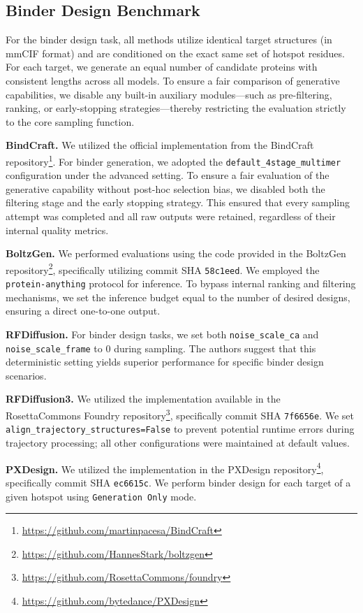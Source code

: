 \subsection{Binder Design Benchmark}
For the binder design task, all methods utilize identical target structures (in mmCIF format) and are conditioned on the exact same set of hotspot residues. For each target, we generate an equal number of candidate proteins with consistent lengths across all models. To ensure a fair comparison of generative capabilities, we disable any built-in auxiliary modules—such as pre-filtering, ranking, or early-stopping strategies—thereby restricting the evaluation strictly to the core sampling function.

\textbf{BindCraft.} We utilized the official implementation from the BindCraft repository\footnote{\url{https://github.com/martinpacesa/BindCraft}}. For binder generation, we adopted the \texttt{default\_4stage\_multimer} configuration under the advanced setting. To ensure a fair evaluation of the generative capability without post-hoc selection bias, we disabled both the filtering stage and the early stopping strategy. This ensured that every sampling attempt was completed and all raw outputs were retained, regardless of their internal quality metrics.

\textbf{BoltzGen.} We performed evaluations using the code provided in the BoltzGen repository\footnote{\url{https://github.com/HannesStark/boltzgen}}, specifically utilizing commit SHA \texttt{58c1eed}. We employed the \texttt{protein-anything} protocol for inference. To bypass internal ranking and filtering mechanisms, we set the inference budget equal to the number of desired designs, ensuring a direct one-to-one output.

\textbf{RFDiffusion.} For binder design tasks, we set both \texttt{noise\_scale\_ca} and \texttt{noise\_scale\_frame} to 0 during sampling. The authors suggest that this deterministic setting yields superior performance for specific binder design scenarios.

\textbf{RFDiffusion3.} We utilized the implementation available in the RosettaCommons Foundry repository\footnote{\url{https://github.com/RosettaCommons/foundry}}, specifically commit SHA \texttt{7f6656e}. We set \texttt{align\_trajectory\_structures=False} to prevent potential runtime errors during trajectory processing; all other configurations were maintained at default values.

\textbf{PXDesign.} We utilized the implementation in the PXDesign repository\footnote{\url{https://github.com/bytedance/PXDesign}}, specifically commit SHA \texttt{ec6615c}. We perform binder design for each target of a given hotspot using \texttt{Generation Only} mode.


